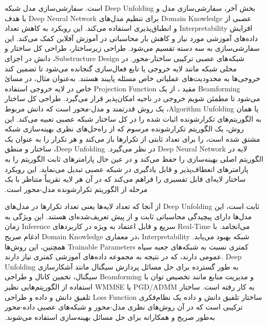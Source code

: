 ‫بخش آخر، سفارشی‌سازی مدل و 
\gls{Deep Unfolding}
است.
‫سفارشی‌سازی مدل شبکه عصبی از 
\gls{Domain Knowledge}
 برای تنظیم مدل‌های 
\gls{Deep Neural Network}
 با هدف افزایش 
\gls{Interpretability}
  و انطباق‌پذیری استفاده می‌کند. این رویکرد به کاهش تعداد داده‌های آموزشی مورد نیاز و کاهش بار محاسباتی در آموزش آفلاین کمک می‌کند. این سفارشی‌سازی به سه دسته تقسیم می‌شود. طراحی زیرساختار، طراحی کل ساختار و شبکه‌های عصبی ترکیبی ساختار-محور.‬
‫در 
\gls{Substructure Design}،
 دانش در اجزای محلی شبکه مانند لایه خروجی یا تابع فعال‌سازی گنجانده می‌شود تا تضمین کند خروجی‌ها به محدودیت‌های عملیاتی خاص مسئله پایبند هستند. به‌عنوان مثال، در مسائ 
\gls{Beamforming}
  مقید 
،
 از یک 
\gls{Projection Function}
  خاص در لایه خروجی استفاده می‌شود تا مطمئن شویم خروجی در ناحیه امکان‌پذیر قرار می‌گیرد.‬
‫طراحی کل ساختار یا همان 
\gls{Algorithm Unfolding}،
 یک روش قدرتمند و مدل-محور است که دانش مربوط به الگوریتم‌های تکرارشونده اثبات شده را در کل ساختار شبکه عصبی تعبیه می‌کند. این روش، یک الگوریتم تکرارشونده مرسوم که از راه‌حل‌های نظری بهینه‌سازی شبکه مشتق شده است، را برای تعداد ثابتی از تکرارها باز می‌کند و هر تکرار را به عنوان یک لایه در 
\gls{Deep Neural Network}
  در نظر می‌گیرد.‬
\gls{Deep Unfolding}،
 ساختار و منطق الگوریتم اصلی بهینه‌سازی را حفظ می‌کند و در عین حال پارامترهای ثابت الگوریتم را به پارامترهای انعطاف‌پذیر و قابل یادگیری در شبکه عصبی تبدیل می‌نماید. این رویکرد ساختار لایه‌ای قابل تفسیری را فراهم می‌کند که در آن هر لایه تقریباً متناظر با یک مرحله از الگوریتم تکرارشونده مدل-محور است.‬
 
از آنجا که تعداد لایه‌ها یعنی تعداد تکرارها در مدل‌های 
\gls{Deep Unfolding}
 ثابت است، این مدل‌ها دارای پیچیدگی محاسباتی ثابت و از پیش تعریف‌شده‌ای هستند. این ویژگی به زمان 
\gls{Inference}
 سریع و قابل اعتماد به ویژه در کاربردهای 
\gls{Real-Time}
  می‌انجامد.‬ با ادغام صریح 
\gls{Domain Knowledge}
   در معماری،
\gls{Interpretability}   
    شبکه بهبود می‌یابد. همچنین، این روش‌ها 
\glspl{Trainable Parameter}
     کمتری نسبت به شبکه‌های جعبه سیاه عمومی دارند، که در نتیجه به مجموعه داده‌های آموزشی کمتری نیاز دارند.‬
\gls{Deep Unfolding}
به طور گسترده برای حل مسائل پردازش سیگنال مانند آشکارسازی سیگنال، تخمین کانال و طراحی 
\gls{Beamforming}
 و مدیریت منابع مانند تخصیص توان با استفاده از الگوریتم‌هایی نظیر 
\gls{WMMSE}
  یا 
\gls{PGD}/\gls{ADMM}
   به کار رفته است.‬ ساختار تلفیق دانش و داده و طراحی
\gls{Loss Function}
‫ساختار تلفیق دانش و داده یک نظام‌فکری ترکیبی است که در آن روش‌های نظری مدل-محور و شبکه‌های عصبی داده-محور به‌طور صریح و همکارانه برای حل مسائل بهینه‌سازی استفاده می‌شوند.

